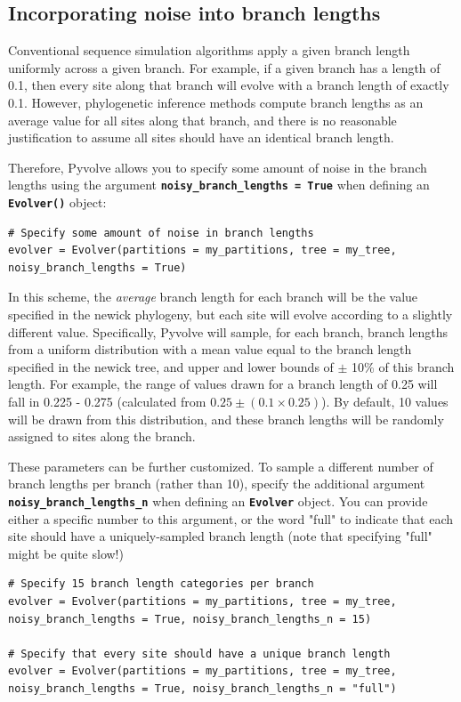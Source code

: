 \documentclass{article}
\newcommand{\code}[1]{\textbf{\texttt{\small{#1}}}}
\begin{document}
\subsection{Incorporating noise into branch lengths}\label{sec:noisybl}

Conventional sequence simulation algorithms apply a given branch length uniformly across a given branch. For example, if a given branch has a length of 0.1, then every site along that branch will evolve with a branch length of exactly 0.1. However, phylogenetic inference methods compute branch lengths as an average value for all sites along that branch, and there is no reasonable justification to assume all sites should have an identical branch length.

Therefore, Pyvolve allows you to specify some amount of noise in the branch lengths using the argument \code{noisy\_branch\_lengths = True} when defining an \code{Evolver()} object:
\begin{lstlisting}
# Specify some amount of noise in branch lengths
evolver = Evolver(partitions = my_partitions, tree = my_tree, noisy_branch_lengths = True)
\end{lstlisting}
In this scheme, the \emph{average} branch length for each branch will be the value specified in the newick phylogeny, but each site will evolve according to a slightly different value. Specifically, Pyvolve will sample, for each branch, branch lengths from a uniform distribution with a mean value equal to the branch length specified in the newick tree, and upper and lower bounds of $\pm$ 10\% of this branch length. For example, the range of values drawn for a branch length of 0.25 will fall in 0.225 - 0.275 (calculated from $0.25 \pm (0.1\times0.25)$). By default, 10 values will be drawn from this distribution, and these branch lengths will be randomly assigned to sites along the branch. 


These parameters can be further customized. To sample a different number of branch lengths per branch (rather than 10), specify the additional argument \code{noisy\_branch\_lengths\_n} when defining an \code{Evolver} object. You can provide either a specific number to this argument, or the word "full" to indicate that each site should have a uniquely-sampled branch length (note that specifying "full" might be quite slow!)
\begin{lstlisting}
# Specify 15 branch length categories per branch
evolver = Evolver(partitions = my_partitions, tree = my_tree, noisy_branch_lengths = True, noisy_branch_lengths_n = 15)
 
# Specify that every site should have a unique branch length
evolver = Evolver(partitions = my_partitions, tree = my_tree, noisy_branch_lengths = True, noisy_branch_lengths_n = "full")
\end{lstlisting}
\end{document}
